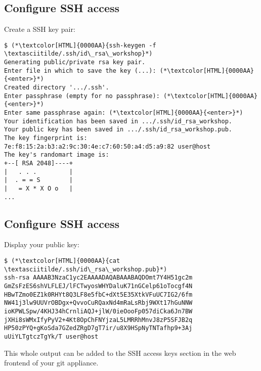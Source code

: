 \subsection{Configure SSH access}
\begin{frame}[fragile]
  \subslidetitle
  Create a SSH key pair:
  \begin{lstlisting}
$ (*\textcolor[HTML]{0000AA}{ssh-keygen -f \textasciitilde/.ssh/id\_rsa\_workshop}*)
Generating public/private rsa key pair.
Enter file in which to save the key (...): (*\textcolor[HTML]{0000AA}{<enter>}*)
Created directory '.../.ssh'.
Enter passphrase (empty for no passphrase): (*\textcolor[HTML]{0000AA}{<enter>}*)
Enter same passphrase again: (*\textcolor[HTML]{0000AA}{<enter>}*)
Your identification has been saved in .../.ssh/id_rsa_workshop.
Your public key has been saved in .../.ssh/id_rsa_workshop.pub.
The key fingerprint is:
7e:f8:15:2a:b3:a2:9c:30:4e:c7:60:50:a4:d5:a9:82 user@host
The key's randomart image is:
+--[ RSA 2048]----+
|   . . .         |
|  . = = S        |
|   = X * X O o   |
...
\end{lstlisting}
\end{frame}

\subsection{Configure SSH access}
\begin{frame}[fragile]
  \subslidetitle
  Display your public key:
  \begin{lstlisting}
$ (*\textcolor[HTML]{0000AA}{cat \textasciitilde/.ssh/id\_rsa\_workshop.pub}*)
ssh-rsa AAAAB3NzaC1yc2EAAAADAQABAAABAQDOmt7Y4H51gc2m
GmZsFzES6shVLFLEJ/lFCTwyosWHYDaluK71nGCelp61oTocgf4N
HBwTZmo0EZ1k0RHYt8Q3LF8e5fbC+dXt5E35XtkVFuUC7IG2/6fm
NW41j3lw9UUVrOBDgx+QvvoCuRQaxNd4mRaLsRbj9WXt17hGuNNW
ioKPWLSpw/4KHJ34hCrnliAQJ+jlW/0ieOooFp057diCka6Jn7BW
jXHi8sWMxIfyPyV2+4Kt8OpChFNYjzaL5LMRRhMnvJ8zP5SFJB2q
HP50zPYQ+gKoSda7GZedZRgD7gT7ir/u8X9HSpNyTNTafhp9+3Aj
uUiYLTgtczTgYk/T user@host
\end{lstlisting}

  This whole output can be added to the SSH access keys
  section in the web frontend of your git appliance.
\end{frame}

